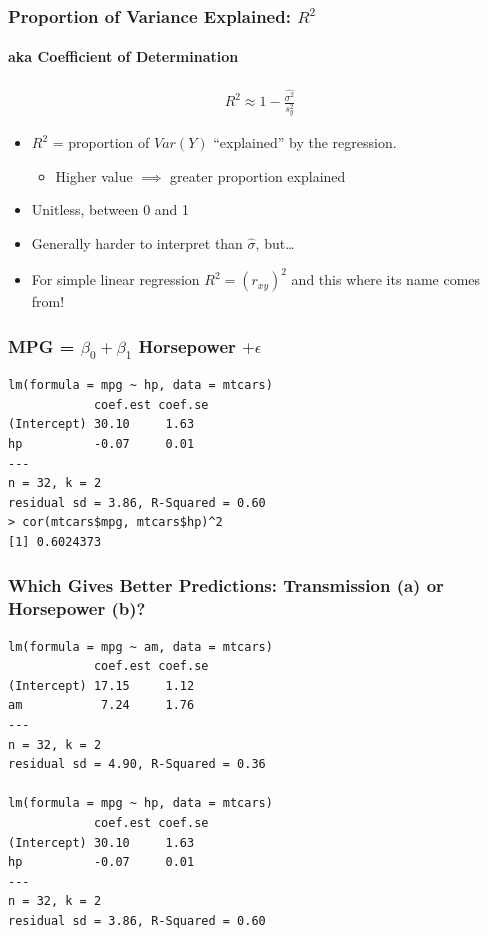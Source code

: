 \documentclass{beamer}
\begin{document}
\begin{frame}
\frametitle{Proportion of Variance Explained: $R^2$}
\framesubtitle{aka Coefficient of Determination}
	\begin{eqnarray*}
		R^2 \approx 1 - \frac{\widehat{\sigma^2}}{s_y^2}
	\end{eqnarray*}
		\begin{itemize}
			\item $R^2$ = proportion of $Var(Y)$ 
        ``explained'' by the regression.
			\begin{itemize}
			\item Higher value $\implies$ greater proportion explained 
			\end{itemize}
			\item Unitless, between 0 and 1 
      \item Generally harder to interpret than $\widehat{\sigma}$, but\dots 
			\item \alert{For simple linear regression $R^2 = (r_{xy})^2$ and this where its name comes from!}
		\end{itemize}
\end{frame}



\begin{frame}[fragile]
\frametitle{MPG = $\beta_0 + \beta_1$ Horsepower $+ \epsilon$}
\footnotesize
\begin{verbatim}
lm(formula = mpg ~ hp, data = mtcars)
            coef.est coef.se
(Intercept) 30.10     1.63  
hp          -0.07     0.01  
---
n = 32, k = 2
residual sd = 3.86, R-Squared = 0.60
> cor(mtcars$mpg, mtcars$hp)^2
[1] 0.6024373
\end{verbatim}
\end{frame}


\begin{frame}[fragile]
\frametitle{Which Gives Better Predictions: Transmission (a) or Horsepower (b)?}
\footnotesize
\begin{verbatim}
lm(formula = mpg ~ am, data = mtcars)
            coef.est coef.se
(Intercept) 17.15     1.12  
am           7.24     1.76  
---
n = 32, k = 2
residual sd = 4.90, R-Squared = 0.36

lm(formula = mpg ~ hp, data = mtcars)
            coef.est coef.se
(Intercept) 30.10     1.63  
hp          -0.07     0.01  
---
n = 32, k = 2
residual sd = 3.86, R-Squared = 0.60
\end{verbatim}

\end{frame}
\end{document}
